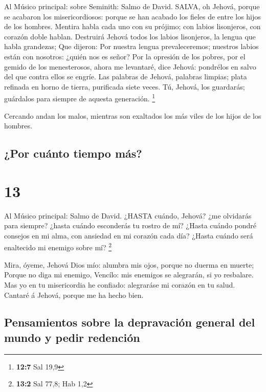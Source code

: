  Al Músico principal: sobre Seminith: Salmo de David. SALVA,
oh Jehová, porque se acabaron los misericordiosos: porque se han acabado
los fieles de entre los hijos de los hombres.  Mentira habla
cada uno con su prójimo; con labios lisonjeros, con corazón doble
hablan.  Destruirá Jehová todos los labios lisonjeros, la
lengua que habla grandezas;  Que dijeron: Por nuestra lengua
prevaleceremos; nuestros labios están con nosotros: ¿quién nos es señor?
 Por la opresión de los pobres, por el gemido de los
menesterosos, ahora me levantaré, dice Jehová: pondrélos en salvo del
que contra ellos se engríe.  Las palabras de Jehová,
palabras limpias; plata refinada en horno de tierra, purificada siete
veces.  Tú, Jehová, los guardarás; guárdalos para siempre de
aquesta generación. \footnote{\textbf{12:7} Sal 19,9}

 Cercando andan los malos, mientras son exaltados los más
viles de los hijos de los hombres.

\hypertarget{por-cuuxe1nto-tiempo-muxe1s}{%
\subsection{¿Por cuánto tiempo más?}\label{por-cuuxe1nto-tiempo-muxe1s}}

\hypertarget{section-12}{%
\section{13}\label{section-12}}

 Al Músico principal: Salmo de David. ¿HASTA cuándo, Jehová?
¿me olvidarás para siempre? ¿hasta cuándo esconderás tu rostro de mí?
 ¿Hasta cuándo pondré consejos en mi alma, con ansiedad en
mi corazón cada día? ¿Hasta cuándo será enaltecido mi enemigo sobre mí?
\footnote{\textbf{13:2} Sal 77,8; Hab 1,2}

 Mira, óyeme, Jehová Dios mío: alumbra mis ojos, porque no
duerma en muerte;  Porque no diga mi enemigo, Vencílo: mis
enemigos se alegrarán, si yo resbalare.  Mas yo en tu
misericordia he confiado: alegraráse mi corazón en tu salud.
 Cantaré á Jehová, porque me ha hecho bien.

\hypertarget{pensamientos-sobre-la-depravaciuxf3n-general-del-mundo-y-pedir-redenciuxf3n}{%
\subsection{Pensamientos sobre la depravación general del mundo y pedir
redención}\label{pensamientos-sobre-la-depravaciuxf3n-general-del-mundo-y-pedir-redenciuxf3n}}

